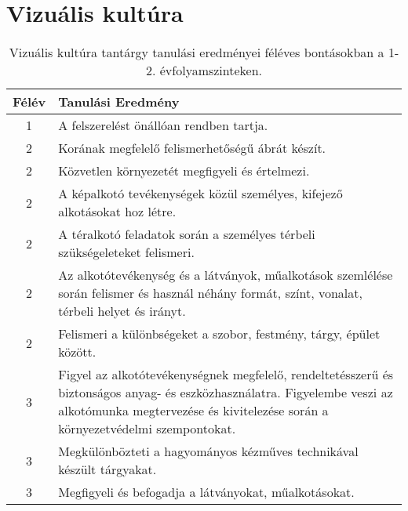             \clearpage

        \section{Vizuális kultúra}

       
           \begin{longtable}{c | p{} }
            \caption[Vizuális kultúra 1-2.]{Vizuális kultúra tantárgy tanulási eredményei féléves bontásokban a 1-2. évfolyamszinteken. }  \\

            \textbf{Félév} & \textbf{Tanulási Eredmény} \\
            \hline
            \endhead
                                
                                          1 &  A felszerelést önállóan rendben tartja. \\ \hline
                                      
                                
                                          2 &  Korának megfelelő felismerhetőségű ábrát készít. \\ \hline
                                          2 &  Közvetlen környezetét megfigyeli és értelmezi. \\ \hline
                                          2 &  A képalkotó tevékenységek közül személyes, kifejező alkotásokat hoz létre. \\ \hline
                                          2 &  A téralkotó feladatok során a személyes térbeli szükségeleteket felismeri. \\ \hline
                                          2 &  Az alkotótevékenység és a látványok, műalkotások szemlélése során felismer és használ néhány formát, színt, vonalat, térbeli helyet és irányt. \\ \hline
                                          2 &  Felismeri a különbségeket a szobor, festmény, tárgy, épület között. \\ \hline
                                      
                                
                                          3 &  Figyel az alkotótevékenységnek megfelelő, rendeltetésszerű és biztonságos anyag- és eszközhasználatra. Figyelembe veszi az alkotómunka megtervezése és kivitelezése során a környezetvédelmi szempontokat. \\ \hline
                                          3 &  Megkülönbözteti a hagyományos kézműves technikával készült tárgyakat. \\ \hline
                                          3 &  Megfigyeli és befogadja a látványokat, műalkotásokat. \\ \hline
                                      

\end{longtable}
